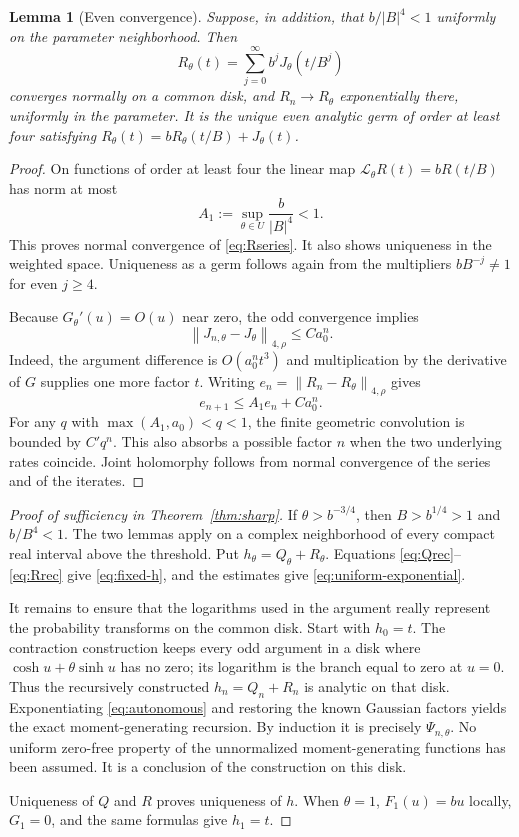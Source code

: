\documentclass[11pt]{article}
\newtheorem{lemma}[theorem]{Lemma}
\theoremstyle{definition}
\newcommand{\norm}[1]{\left\lVert #1\right\rVert}
\begin{document}
\begin{lemma}[Even convergence]\label{lem:even-contraction}
Suppose, in addition, that $b/|B|^4<1$ uniformly on the parameter
neighborhood. Then
\begin{equation}\label{eq:Rseries}
 R_\theta(t)=\sum_{j=0}^{\infty}b^jJ_\theta(t/B^j)
\end{equation}
converges normally on a common disk, and $R_n\to R_\theta$
exponentially there, uniformly in the parameter. It is the unique even
analytic germ of order at least four satisfying
$R_\theta(t)=bR_\theta(t/B)+J_\theta(t)$.
\end{lemma}

\begin{proof}
On functions of order at least four the linear map
$\mathcal L_\theta R(t)=bR(t/B)$ has norm at most
\[
                     A_1:=\sup_{\theta\in U}\frac b{|B|^4}<1.
\]
This proves normal convergence of \eqref{eq:Rseries}. It also shows
uniqueness in the weighted space. Uniqueness as a germ follows again
from the multipliers $bB^{-j}\neq1$ for even $j\geq4$.

Because $G_\theta'(u)=O(u)$ near zero, the odd convergence implies
\[
 \norm{J_{n,\theta}-J_\theta}_{4,\rho}\leq C a_0^n.
\]
Indeed, the argument difference is $O(a_0^n t^3)$ and multiplication
by the derivative of $G$ supplies one more factor $t$.
Writing $e_n=\norm{R_n-R_\theta}_{4,\rho}$ gives
\[
 e_{n+1}\leq A_1e_n+Ca_0^n.
\]
For any $q$ with $\max(A_1,a_0)<q<1$, the finite geometric convolution
is bounded by $C'q^n$. This also absorbs a possible factor $n$ when the
two underlying rates coincide. Joint holomorphy follows from normal
convergence of the series and of the iterates.
\end{proof}

\begin{proof}[Proof of sufficiency in Theorem~\ref{thm:sharp}]
If $\theta>b^{-3/4}$, then $B>b^{1/4}>1$ and $b/B^4<1$.
The two lemmas apply on a complex neighborhood of every compact real
interval above the threshold. Put $h_\theta=Q_\theta+R_\theta$.
Equations \eqref{eq:Qrec}--\eqref{eq:Rrec} give
\eqref{eq:fixed-h}, and the estimates give
\eqref{eq:uniform-exponential}.

It remains to ensure that the logarithms used in the argument really
represent the probability transforms on the common disk. Start with
$h_0=t$. The contraction construction keeps every odd argument in a
disk where $\cosh u+\theta\sinh u$ has no zero; its logarithm is the
branch equal to zero at $u=0$. Thus the recursively constructed
$h_n=Q_n+R_n$ is analytic on that disk. Exponentiating
\eqref{eq:autonomous} and restoring the known Gaussian factors yields
the exact moment-generating recursion. By induction it is precisely
$\Psi_{n,\theta}$. No uniform zero-free property of the unnormalized
moment-generating functions has been assumed. It is a conclusion of the
construction on this disk.

Uniqueness of $Q$ and $R$ proves uniqueness of $h$. When $\theta=1$,
$F_1(u)=bu$ locally, $G_1=0$, and the same formulas give $h_1=t$.
\end{proof}
\end{document}
